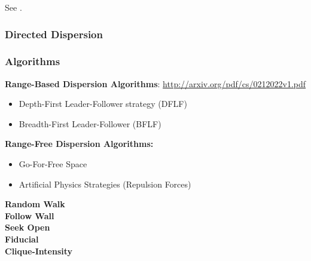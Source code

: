 
See \cite{morlok2007dispersing,mclurkin2007distributed}.

\subsubsection{Directed Dispersion}

\subsubsection{Algorithms}

	\textbf{Range-Based Dispersion Algorithms}: \url{http://arxiv.org/pdf/cs/0212022v1.pdf}
	\begin{itemize}
		\item Depth-First Leader-Follower strategy (DFLF)
		\item Breadth-First Leader-Follower (BFLF)
	\end{itemize}
	\textbf{Range-Free Dispersion Algorithms:}
	\begin{itemize}
		\item Go-For-Free Space
		\item Artificial Physics Strategies (Repulsion Forces)
	\end{itemize}
	\textbf{Random Walk}\cite{morlok2007dispersing}\\
	\textbf{Follow Wall}\cite{morlok2007dispersing}\\
	\textbf{Seek Open}\cite{morlok2007dispersing}\\
	\textbf{Fiducial}\cite{morlok2007dispersing}\\
	\textbf{Clique-Intensity}\cite{ludwig2006robotic}\\

